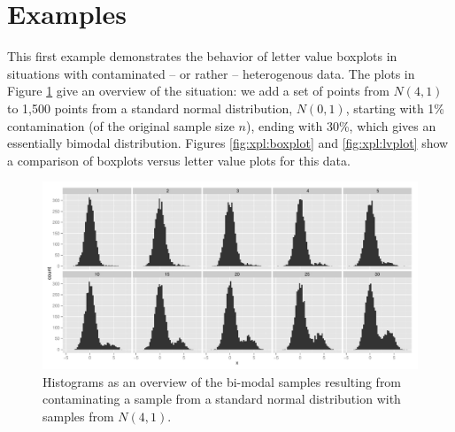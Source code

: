 \documentclass[12pt,oneside]{article}
\begin{document}
\section{Examples}\label{examples}
This first example demonstrates the behavior of letter value boxplots in situations with contaminated -- or rather -- heterogenous data.
The plots in Figure \ref{fig:xpl:histogram} give an overview of the situation:  we add a set of points from $N(4,1)$ to 1,500 points from a standard normal distribution, $N(0,1)$, starting with 1\% contamination (of the original sample size $n$), ending with 30\%, which gives an essentially bimodal distribution. Figures \ref{fig:xpl:boxplot} and \ref{fig:xpl:lvplot} show a comparison of boxplots versus letter value plots for this data.  
\begin{figure}[htbp] %
   \centering
   \includegraphics[width=.9\linewidth]{xpl-histogram} 
   \caption{Histograms as an overview of the bi-modal samples resulting from contaminating a sample from a standard normal distribution with samples from $N(4,1)$.}
   \label{fig:xpl:histogram}
\end{figure}
\end{document}
